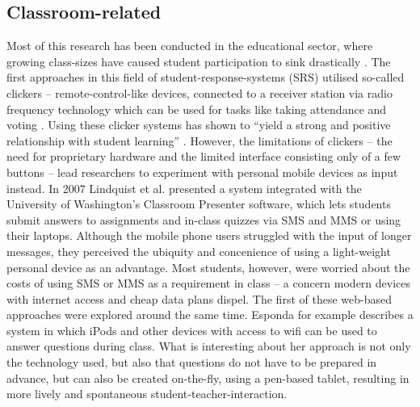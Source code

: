 \subsection{Classroom-related}
Most of this research has been conducted in the educational sector, where growing class-sizes have caused student participation to sink drastically \cite{Bry:Backstage}. The first ap\-proa\-ches in this field of student-response-systems (SRS) utilised so-called clickers -- remote-control-like devices, connected to a receiver station via radio frequency technology \cite{cuclickers:faq} which can be used for tasks like taking attendance and voting \cite{Chamillard:StudentResponseSystem}. Using these clicker systems has shown to ``yield a strong and positive relationship with student learning'' \cite{Chamillard:StudentResponseSystem}. However, the limitations of clickers -- the need for proprietary hardware and the limited interface consisting only of a few buttons -- lead researchers to experiment with personal mobile devices as input instead. In 2007 Lindquist et al. \cite{Lindquist:ExploringMobilePhonesActiveLearning} presented a system integrated with the University of Washington's Classroom Presenter software, which lets students submit answers to assignments and in-class quizzes via SMS and MMS or using their laptops. Although the mobile phone users struggled with the input of longer messages, they perceived the ubiquity and concenience of using a light-weight personal device as an advantage. Most students, however, were worried about the costs of using SMS or MMS as a requirement in class -- a concern modern devices with internet access and cheap data plans dispel. The first of these web-based approaches were explored around the same time. Esponda \cite{Esponda:ElectronicVotingOnTheFly} for example describes a system in which iPods and other devices with access to wifi can be used to answer questions during class. What is interesting about her approach is not only the technology used, but also that questions do not have to be prepared in advance, but can also be created on-the-fly, using a pen-based tablet, resulting in more lively and spontaneous student-teacher-interaction.

